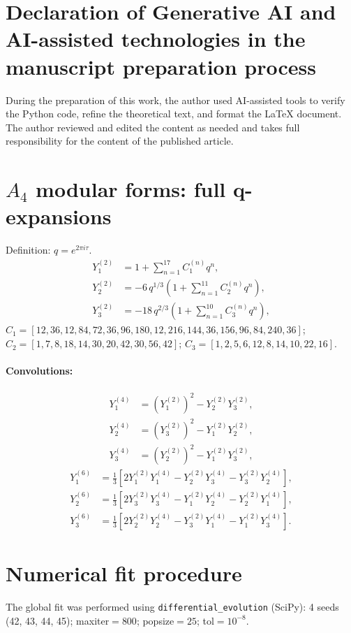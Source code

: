 \documentclass[12pt,a4paper]{article}
\numberwithin{equation}{section}
\begin{document}
\section*{Declaration of Generative AI and AI-assisted technologies in the manuscript preparation process}
During the preparation of this work, the author used AI-assisted tools to verify the Python code, refine the theoretical text, and format the LaTeX document. The author reviewed and edited the content as needed and takes full responsibility for the content of the published article.

\appendix
\newpage

\section{\(A_4\) modular forms: full q-expansions}
Definition: \(q = e^{2\pi i\tau}\).
\begin{align}
Y_1^{(2)} &= 1 + \sum_{n=1}^{17} C_1^{(n)} q^n, \\
Y_2^{(2)} &= -6\, q^{1/3}\left(1 + \sum_{n=1}^{11} C_2^{(n)} q^n\right), \\
Y_3^{(2)} &= -18\, q^{2/3}\left(1 + \sum_{n=1}^{10} C_3^{(n)} q^n\right),
\end{align}
\(C_1 = [12, 36, 12, 84, 72, 36, 96, 180, 12, 216, 144, 36, 156, 96, 84, 240, 36]\);
\(C_2 = [1, 7, 8, 18, 14, 30, 20, 42, 30, 56, 42]\);
\(C_3 = [1, 2, 5, 6, 12, 8, 14, 10, 22, 16]\).
\paragraph{Convolutions:}
\begin{align}
Y_1^{(4)} &= (Y_1^{(2)})^2 - Y_2^{(2)} Y_3^{(2)}, \\
Y_2^{(4)} &= (Y_3^{(2)})^2 - Y_1^{(2)} Y_2^{(2)}, \\
Y_3^{(4)} &= (Y_2^{(2)})^2 - Y_1^{(2)} Y_3^{(2)},
\end{align}
\begin{align}
Y_1^{(6)} &= \tfrac13\left[2 Y_1^{(2)} Y_1^{(4)} - Y_2^{(2)} Y_3^{(4)} - Y_3^{(2)} Y_2^{(4)}\right], \\
Y_2^{(6)} &= \tfrac13\left[2 Y_3^{(2)} Y_3^{(4)} - Y_1^{(2)} Y_2^{(4)} - Y_2^{(2)} Y_1^{(4)}\right], \\
Y_3^{(6)} &= \tfrac13\left[2 Y_2^{(2)} Y_2^{(4)} - Y_3^{(2)} Y_1^{(4)} - Y_1^{(2)} Y_3^{(4)}\right].
\end{align}

\section{Numerical fit procedure}
The global fit was performed using \texttt{differential\_evolution} (SciPy): 4 seeds (42, 43, 44, 45); maxiter\(=800\); popsize\(=25\); tol\(=10^{-8}\).
\end{document}

